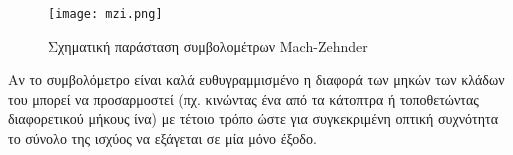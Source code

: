 \begin{figure}[h]
  \centering
  \texttt{[image: mzi.png]}
  \caption{Σχηματική παράσταση συμβολομέτρων Mach-Zehnder}
  \label{fig:mzi}
\end{figure}

Αν το συμβολόμετρο είναι καλά ευθυγραμμισμένο η διαφορά των μηκών των
κλάδων του μπορεί να προσαρμοστεί (πχ. κινώντας ένα από τα κάτοπτρα ή
τοποθετώντας διαφορετικού μήκους ίνα) με τέτοιο τρόπο ώστε για
συγκεκριμένη οπτική συχνότητα το σύνολο της ισχύος να εξάγεται σε μία
μόνο έξοδο.


